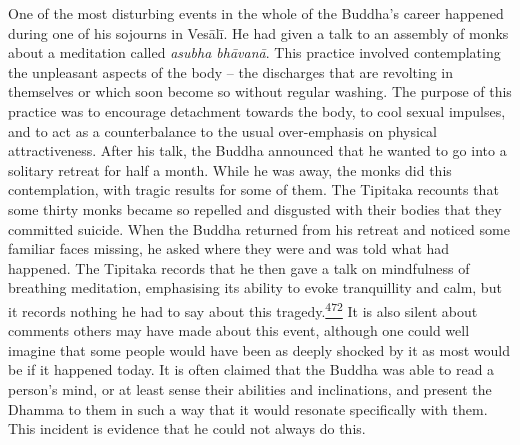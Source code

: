 One of the most disturbing events in the whole of the Buddha's career
happened during one of his sojourns in Vesālī. He had given a talk to an
assembly of monks about a meditation called \emph{asubha bhāvanā}. This
practice involved contemplating the unpleasant aspects of the body --
the discharges that are revolting in themselves or which soon become so
without regular washing. The purpose of this practice was to encourage
detachment towards the body, to cool sexual impulses, and to act as a
counterbalance to the usual over-emphasis on physical attractiveness.
After his talk, the Buddha announced that he wanted to go into a
solitary retreat for half a month. While he was away, the monks did this
contemplation, with tragic results for some of them. The Tipitaka
recounts that some thirty monks became so repelled and disgusted with
their bodies that they committed suicide. When the Buddha returned from
his retreat and noticed some familiar faces missing, he asked where they
were and was told what had happened. The Tipitaka records that he then
gave a talk on mindfulness of breathing meditation, emphasising its
ability to evoke tranquillity and calm, but it records nothing he had to
say about this
tragedy.\label{footprints_split_013.html_fnref472}\hyperref[footprints_split_025.htmlux5cux23fn472]{\textsuperscript{472}}
It is also silent about comments others may have made about this event,
although one could well imagine that some people would have been as
deeply shocked by it as most would be if it happened today. It is often
claimed that the Buddha was able to read a person's mind, or at least
sense their abilities and inclinations, and present the Dhamma to them
in such a way that it would resonate specifically with them. This
incident is evidence that he could not always do this.

